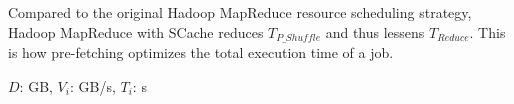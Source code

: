 {%


Compared to the original Hadoop MapReduce resource scheduling strategy, Hadoop MapReduce with SCache reduces \(T_{P\_Shuffle}\) and thus lessens \(T_{Reduce}\). This is how pre-fetching optimizes the total execution time of a job.


\begin{table}[!t]
\caption{\color{blue}Hadoop MapReduce on 4 nodes cluster in the FRQ model}
\label{table1}
\begin{minipage}{\columnwidth}
\centering
\(D\): GB, \(V_{i}\): GB/s, \(T_{i}\): s
\end{minipage}
\end{table}}
